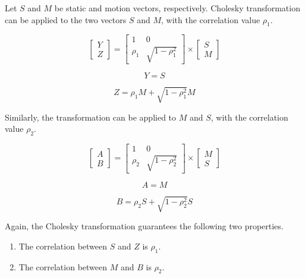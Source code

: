 Let $S$ and $M$ be static and motion vectors, respectively. Cholesky transformation can be applied to the two vectors $S$ and $M$,
with the correlation value $\rho_{1}$.

\begin{equation}
\begin{bmatrix}
    Y     \\
    Z
\end{bmatrix}
=
\begin{bmatrix}
    1  & 0 \\
    \rho_{1}  & \sqrt{1-\rho_{1}^2}
\end{bmatrix}
\times
\begin{bmatrix}
    S    \\
    M
\end{bmatrix}
\end{equation}

\begin{equation}
Y = S
\end{equation}

\begin{equation}
Z = \rho_{1} M + \sqrt{1-\rho_{1}^2}M
\end{equation}

Similarly, the transformation can be applied to $M$ and $S$, with the correlation value $\rho_{2}$.


\begin{equation}
\begin{bmatrix}
    A     \\
    B
\end{bmatrix}
=
\begin{bmatrix}
    1  & 0 \\
    \rho_{2}  & \sqrt{1-\rho_{2}^2}
\end{bmatrix}
\times
\begin{bmatrix}
    M    \\
    S
\end{bmatrix}
\end{equation}

\begin{equation}
A = M
\end{equation}

\begin{equation}
B = \rho_{2} S + \sqrt{1-\rho_{2}^2}S
\end{equation}

Again, the Cholesky transformation guarantees the following two properties.


\begin{enumerate}
  \item The correlation between $S$ and $Z$ is $\rho_{1}$.
  \item The correlation between $M$ and $B$ is $\rho_{2}$.
\end{enumerate}


